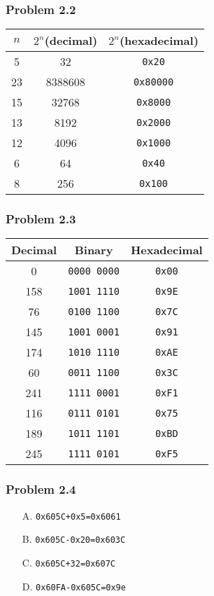 \documentclass[a4paper]{article}
\begin{document}
\subsubsection*{Problem 2.2}
\begin{tabular}{ccc}
    $n$&$2^n$(decimal)&$2^n$(hexadecimal)\\
    \hline
    5   &32     &\texttt{0x20}\\
    23  &8388608&\texttt{0x80000}\\
    15  &32768  &\texttt{0x8000}\\
    13  &8192   &\texttt{0x2000}\\
    12  &4096   &\texttt{0x1000}\\
    6   &64     &\texttt{0x40}\\
    8   &256    &\texttt{0x100}
\end{tabular}

\subsubsection*{Problem 2.3}
\begin{tabular}{ccc}
    Decimal &Binary      &Hexadecimal\\
    \hline
    0       &\texttt{0000 0000}   &\texttt{0x00}\\
    158     &\texttt{1001 1110}   &\texttt{0x9E}\\
    76      &\texttt{0100 1100}   &\texttt{0x7C}\\
    145     &\texttt{1001 0001}   &\texttt{0x91}\\
    174     &\texttt{1010 1110}   &\texttt{0xAE}\\
    60      &\texttt{0011 1100}   &\texttt{0x3C}\\
    241     &\texttt{1111 0001}   &\texttt{0xF1}\\
    116     &\texttt{0111 0101}   &\texttt{0x75}\\
    189     &\texttt{1011 1101}   &\texttt{0xBD}\\
    245     &\texttt{1111 0101}   &\texttt{0xF5}
\end{tabular}

\subsubsection*{Problem 2.4}
\begin{enumerate}
    \item [A.] \texttt{0x605C+0x5=0x6061}
    \item [B.] \texttt{0x605C-0x20=0x603C}
    \item [C.] \texttt{0x605C+32=0x607C}
    \item [D.] \texttt{0x60FA-0x605C=0x9e}
\end{enumerate}
\end{document}
